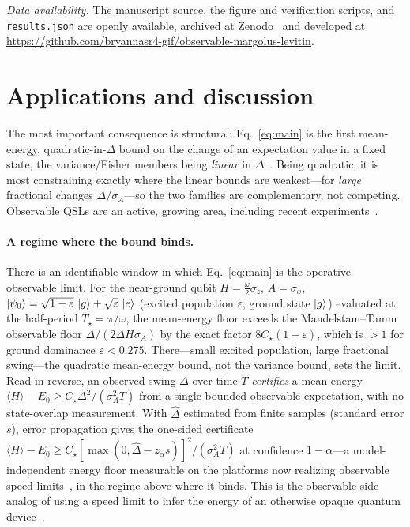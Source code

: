 \documentclass[aps,pra,twocolumn,superscriptaddress,nofootinbib,longbibliography]{revtex4-2}
\newcommand{\Ctrue}{C_{\star}}
\newcommand{\mean}[1]{\langle #1 \rangle}
\begin{document}
\medskip\noindent\emph{Data availability.} The manuscript source, the figure and verification scripts, and
\texttt{results.json} are openly available, archived at Zenodo~\cite{repo} and developed at
\url{https://github.com/bryannasr4-gif/observable-margolus-levitin}.

\section{Applications and discussion}
\label{sec:apps}
The most important consequence is structural: Eq.~\eqref{eq:main} is the first mean-energy, quadratic-in-$\Delta$
bound on the change of an expectation value in a fixed state, the variance/Fisher members being \emph{linear} in
$\Delta$~\cite{GarciaPintos2022UnifyingObservables,mohan2022quantum,Bringewatt2024GeneralizedGeometric}.
Being quadratic, it is most constraining exactly where the linear bounds are weakest---for \emph{large}
fractional changes $\Delta/\sigma_A$---so the two families are complementary, not competing. Observable QSLs
are an active, growing area, including recent experiments~\cite{Miao2025Experiment}.

\paragraph{A regime where the bound binds.}
There is an identifiable window in which Eq.~\eqref{eq:main} is the operative observable limit. For the
near-ground qubit $H=\tfrac\omega2\sigma_z$, $A=\sigma_x$,
$\ket{\psi_0}=\sqrt{1-\varepsilon}\,\ket g+\sqrt\varepsilon\,\ket e$ (excited population $\varepsilon$, ground
state $\ket g$) evaluated at the half-period $T_\star=\pi/\omega$, the mean-energy floor exceeds the
Mandelstam--Tamm observable floor $\Delta/(2\Delta H\sigma_A)$ by the exact factor $8\Ctrue(1-\varepsilon)$,
which is $>1$ for ground dominance $\varepsilon<0.275$. There---small excited population, large fractional
swing---the quadratic mean-energy bound, not the variance bound, sets the limit. Read in reverse,
an observed swing $\Delta$ over time $T$ \emph{certifies} a mean energy $\mean H-E_0\ge\Ctrue\Delta^2/(\sigma_A^2T)$
from a single bounded-observable expectation, with no state-overlap measurement. With $\hat\Delta$ estimated
from finite samples (standard error $s$), error propagation gives the one-sided certificate
$\mean H-E_0\ge\Ctrue[\max(0,\hat\Delta-z_\alpha s)]^2/(\sigma_A^2T)$ at confidence $1-\alpha$---a
model-independent energy floor measurable on the platforms now realizing observable speed
limits~\cite{Miao2025Experiment}, in the regime above where it binds. This is the observable-side analog of
using a speed limit to infer the energy of an otherwise opaque quantum
device~\cite{ishida2025energyinference}.
\end{document}
